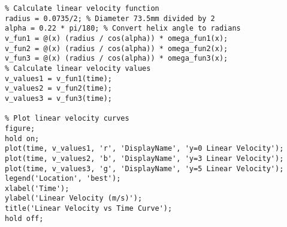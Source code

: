 \documentclass{mcmthesis}  %
\begin{document}
\begin{appendices}
\begin{verbatim}
% Calculate linear velocity function
radius = 0.0735/2; % Diameter 73.5mm divided by 2
alpha = 0.22 * pi/180; % Convert helix angle to radians
v_fun1 = @(x) (radius / cos(alpha)) * omega_fun1(x);
v_fun2 = @(x) (radius / cos(alpha)) * omega_fun2(x);
v_fun3 = @(x) (radius / cos(alpha)) * omega_fun3(x);
% Calculate linear velocity values
v_values1 = v_fun1(time);
v_values2 = v_fun2(time);
v_values3 = v_fun3(time);

% Plot linear velocity curves
figure;
hold on;
plot(time, v_values1, 'r', 'DisplayName', 'y=0 Linear Velocity');
plot(time, v_values2, 'b', 'DisplayName', 'y=3 Linear Velocity');
plot(time, v_values3, 'g', 'DisplayName', 'y=5 Linear Velocity');
legend('Location', 'best');
xlabel('Time');
ylabel('Linear Velocity (m/s)');
title('Linear Velocity vs Time Curve');
hold off;
\end{verbatim}

\end{appendices}  %
\end{document}
